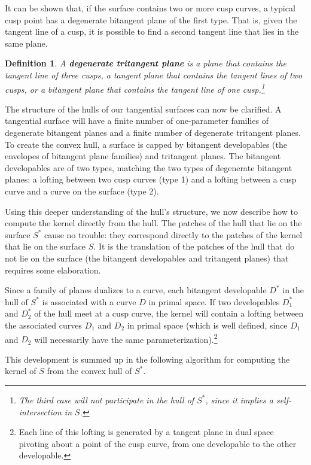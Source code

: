 \documentclass[12pt]{article}
\newtheorem{defn2}[theorem]{Definition}
\begin{document}
It can be shown that, if the surface contains two or more cusp curves,
a typical cusp point has a degenerate bitangent plane of the first type.
That is, given the tangent line of a cusp, 
it is possible to find a second tangent line that lies in the same plane.

\begin{defn2}
A {\bf degenerate tritangent plane} is 
a plane that contains the tangent line of three cusps, 
a tangent plane that contains the tangent lines of two cusps,
or a bitangent plane that contains the tangent line of one cusp.\footnote{The
	third case will not participate in the hull of $S^*$, since
	it implies a self-intersection in $S$.}
\end{defn2}

The structure of the hulls of our tangential surfaces can now be clarified.
A tangential surface will have a finite number of one-parameter families of degenerate bitangent planes
and a finite number of degenerate tritangent planes.
To create the convex hull, a surface is capped by bitangent developables
(the envelopes of bitangent plane families) and tritangent planes.
The bitangent developables
are of two types, matching the two types of degenerate bitangent planes: 
a lofting between two cusp curves (type 1) and
a lofting between a cusp curve and a curve on the surface (type 2).

Using this deeper understanding of the hull's structure,
we now describe how to compute the kernel directly from the hull.
The patches of the hull that lie on the surface $S^*$
cause no trouble: they correspond directly
to the patches of the kernel that lie on the surface $S$.
It is the translation of the patches of the hull that do not lie on the surface 
(the bitangent developables and tritangent planes)
that requires some elaboration.

Since a family of planes dualizes to a curve,
each bitangent developable $D^*$ in the hull of $S^*$ 
is associated with a curve $D$ in primal space.
If two developables $D_1^*$ and $D_2^*$ of the hull meet at a cusp curve, 
the kernel will contain a lofting between the associated curves 
$D_1$ and $D_2$ in primal space 
(which is well defined, since $D_1$ and $D_2$ 
will necessarily have the same parameterization).\footnote{Each line 
	of this lofting is generated by a tangent plane in dual space pivoting 
	about a point of the cusp curve,
	from one developable to the other developable.}

This development is summed up in the following algorithm for computing the kernel of $S$ 
from the convex hull of $S^*$.
\end{document}
